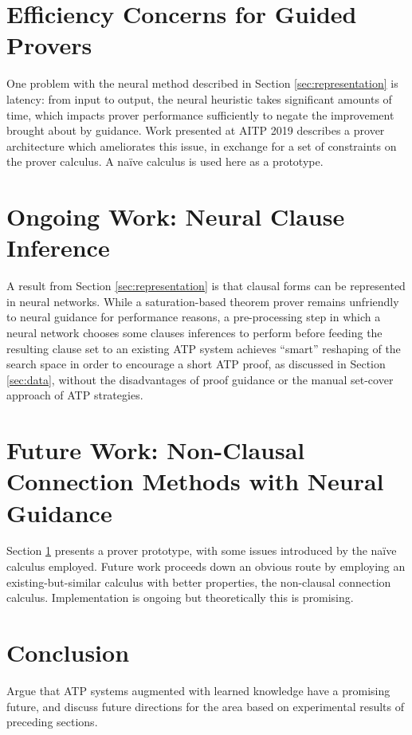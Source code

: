 \documentclass[a4paper]{article}
\begin{document}
\section{Efficiency Concerns for Guided Provers}
\label{sec:efficiency}
One problem with the neural method described in Section \ref{sec:representation} is latency: from input to output, the neural heuristic takes significant amounts of time, which impacts prover performance sufficiently to negate the improvement brought about by guidance.
Work presented at AITP 2019 describes a prover architecture which ameliorates this issue, in exchange for a set of constraints on the prover calculus.
A na\"ive calculus is used here as a prototype.

\section{Ongoing Work: Neural Clause Inference}
A result from Section \ref{sec:representation} is that clausal forms can be represented in neural networks.
While a saturation-based theorem prover remains unfriendly to neural guidance for performance reasons, a pre-processing step in which a neural network chooses some clauses inferences to perform before feeding the resulting clause set to an existing ATP system achieves ``smart'' reshaping of the search space in order to encourage a short ATP proof, as discussed in Section \ref{sec:data}, without the disadvantages of proof guidance or the manual set-cover approach of ATP strategies.

\section{Future Work: Non-Clausal Connection Methods with Neural Guidance}
Section \ref{sec:efficiency} presents a prover prototype, with some issues introduced by the na\"ive calculus employed.
Future work proceeds down an obvious route by employing an existing-but-similar calculus with better properties, the non-clausal connection calculus.
Implementation is ongoing but theoretically this is promising.

\section{Conclusion}
Argue that ATP systems augmented with learned knowledge have a promising future, and discuss future directions for the area based on experimental results of preceding sections.

\printbibliography
\end{document}
